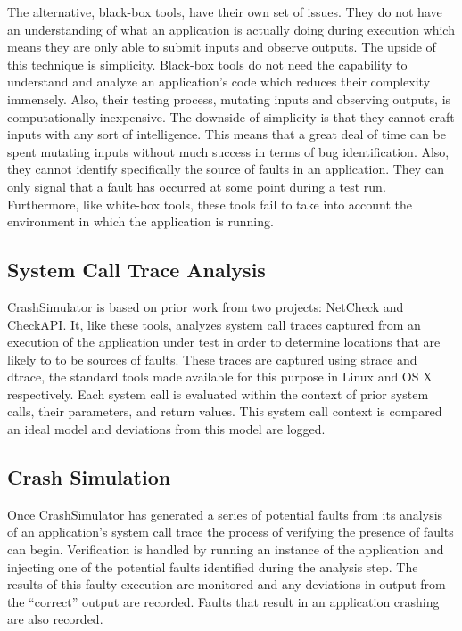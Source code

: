         The alternative, black-box tools, have their own set of issues. They do not have an understanding of what an
        application is actually doing during execution which means they are only able to submit inputs and observe
        outputs.  The upside of this technique is simplicity. Black-box tools do not need the capability to understand
        and analyze an application's code which reduces their complexity immensely. Also, their testing process,
        mutating inputs and observing outputs, is computationally inexpensive. The downside of simplicity is that they
        cannot craft inputs with any sort of intelligence. This means that a great deal of time can be spent mutating
        inputs without much success in terms of bug identification. Also, they cannot identify specifically the source
        of faults in an application. They can only signal that a fault has occurred at some point during a test run.
        Furthermore, like white-box tools, these tools fail to take into account the environment in which the
        application is running.

    \subsection{System Call Trace Analysis}

        CrashSimulator is based on prior work from two projects: NetCheck and CheckAPI. It, like these tools, analyzes
        system call traces captured from an execution of the application under test in order to determine locations that
        are likely to to be sources of faults. These traces are captured using strace and dtrace, the standard tools
        made available for this purpose in Linux and OS X respectively. Each system call is evaluated within the context
        of prior system calls, their parameters, and return values. This system call context is compared an ideal model
        and deviations from this model are logged.

    \subsection{Crash Simulation}

        Once CrashSimulator has generated a series of potential faults from its analysis of an application's system call
        trace the process of verifying the presence of faults can begin. Verification is handled by running an instance
        of the application and injecting one of the potential faults identified during the analysis step.  The results
        of this faulty execution are monitored and any deviations in output from the ``correct'' output are recorded.
        Faults that result in an application crashing are also recorded.
